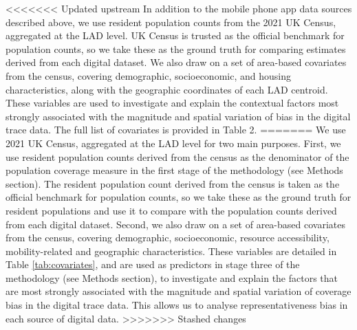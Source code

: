 \documentclass[]{rsos}%
\begin{document}
<<<<<<< Updated upstream
In addition to the mobile phone app data sources described above, we use
resident population counts from the 2021 UK Census, aggregated at the
LAD level. UK Census is trusted as the official benchmark for population
counts, so we take these as the ground truth for comparing estimates
derived from each digital dataset. We also draw on a set of area-based
covariates from the census, covering demographic, socioeconomic, and
housing characteristics, along with the geographic coordinates of each
LAD centroid. These variables are used to investigate and explain the
contextual factors most strongly associated with the magnitude and
spatial variation of bias in the digital trace data. The full list of
covariates is provided in Table 2.
=======
We use 2021 UK Census, aggregated at the LAD level for two main
purposes. First, we use resident population counts derived from the
census as the denominator of the population coverage measure in the
first stage of the methodology (see Methods section). The resident
population count derived from the census is taken as the official
benchmark for population counts, so we take these as the ground truth
for resident populations and use it to compare with the population
counts derived from each digital dataset. Second, we also draw on a set
of area-based covariates from the census, covering demographic,
socioeconomic, resource accessibility, mobility-related and geographic
characteristics. These variables are detailed in Table
\ref{tab:covariates}, and are used as predictors in stage three of the
methodology (see Methods section), to investigate and explain the
factors that are most strongly associated with the magnitude and spatial
variation of coverage bias in the digital trace data. This allows us to
analyse representativeness bias in each source of digital data.
>>>>>>> Stashed changes
\end{document}
